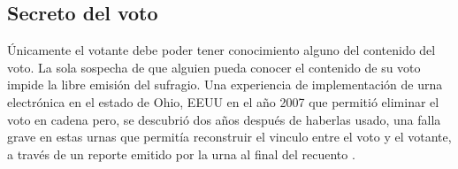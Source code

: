 \subsection{Secreto del voto}
Únicamente el votante debe poder tener conocimiento alguno del contenido del voto. La sola sospecha de que alguien pueda conocer el contenido de su voto impide la libre emisión del sufragio.
Una experiencia de implementación de urna electrónica en el estado de Ohio, EEUU en el año 2007 que permitió eliminar el voto en cadena pero, se descubrió dos años después de haberlas usado, una falla grave en estas urnas que permitía reconstruir el vinculo entre el voto y el votante, a través de un reporte emitido por la urna al final del recuento \cite{mcdaniel2007everest}.

